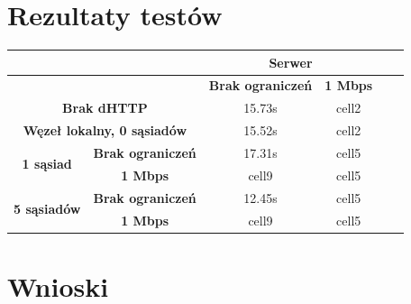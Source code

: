 \section{Rezultaty testów}
\begin{table}[H]
\centering
    \begin{tabular}{|c|c|c|c|c|c|}
        \hline
         & & \multicolumn{2}{c|}{\textbf{Serwer}} \\ \hline
         & & \textbf{Brak ograniczeń} & \textbf{1 Mbps} \\ \hline
         \multicolumn{2}{|c|}{\textbf{Brak dHTTP}} & 15.73s & cell2 \\ \hline
         \multicolumn{2}{|c|}{\textbf{Węzeł lokalny, 0 sąsiadów}} & 15.52s & cell2 \\ \hline \hline
         \multirow{2}{*}{\textbf{1 sąsiad}} & \textbf{Brak ograniczeń} & 17.31s & cell5 \\ 
          & \textbf{1 Mbps} & cell9 & cell5 \\  \hline
         \multirow{2}{*}{\textbf{5 sąsiadów}} & \textbf{Brak ograniczeń} & 12.45s & cell5 \\ 
          & \textbf{1 Mbps} & cell9 & cell5 \\  \hline
    \end{tabular}
    \label{tab:test-results}
\end{table}

\section{Wnioski}